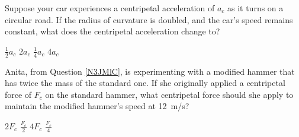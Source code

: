 \documentclass[dvipsnames]{exam}
\begin{document}
\begin{questions}
\question
Suppose your car experiences a centripetal acceleration of $a_c$ as it turns on a circular road. If the radius of curvature is doubled, and the car's speed remains constant, what does the centripetal acceleration change to?

\begin{randomizechoices}
    \correctchoice $\frac{1}{2} a_c$
    \choice $2 a_c$
    \choice $\frac{1}{4} a_c$
    \choice $4 a_c$
\end{randomizechoices}

\question Anita, from Question \ref{N3JMlC}, is experimenting with a modified hammer that has twice the mass of the standard one. If she originally applied a centripetal force of $F_c$ on the standard hammer, what centripetal force should she apply to maintain the modified hammer's speed at \SI{12}{m/s}?

\begin{randomizechoices}
    \correctchoice $2 F_c$
    \choice $\frac{F_c}{2}$
    \choice $4 F_c$
    \choice $\frac{F_c}{4}$
\end{randomizechoices}

    





\end{questions}
\end{document}
